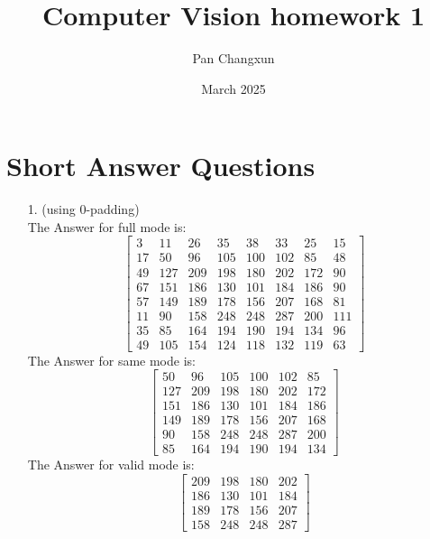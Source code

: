 \documentclass[]{article}
\title{Computer Vision homework 1}
\author{Pan Changxun}
\date{March 2025}
\begin{document}
\maketitle

\section{Short Answer Questions}
\begin{enumerate}
	\item[1.]
	(using 0-padding)\\
		The Answer for full mode is:
		\begin{equation*}
			\begin{bmatrix}
				3 & 11 & 26 & 35 & 38 & 33 & 25 & 15 \\
				17 & 50 & 96 & 105 & 100 & 102 & 85 & 48 \\
				49 & 127 & 209 & 198 & 180 & 202 & 172 & 90 \\
				67 & 151 & 186 & 130 & 101 & 184 & 186 & 90 \\
				57 & 149 & 189 & 178 & 156 & 207 & 168 & 81 \\
				11 & 90 & 158 & 248 & 248 & 287 & 200 & 111 \\
				35 & 85 & 164 & 194 & 190 & 194 & 134 & 96 \\
				49 & 105 & 154 & 124 & 118 & 132 & 119 & 63
			\end{bmatrix}
		\end{equation*}
		The Answer for same mode is:
		\begin{equation*}
			\begin{bmatrix}
				50 & 96 & 105 & 100 & 102 & 85 \\
				127 & 209 & 198 & 180 & 202 & 172 \\
				151 & 186 & 130 & 101 & 184 & 186 \\
				149 & 189 & 178 & 156 & 207 & 168 \\
				90 & 158 & 248 & 248 & 287 & 200 \\
				85 & 164 & 194 & 190 & 194 & 134
			\end{bmatrix}
		\end{equation*}
		The Answer for valid mode is:
		\begin{equation*}
			\begin{bmatrix}
				209 & 198 & 180 & 202 \\
				186 & 130 & 101 & 184 \\
				189 & 178 & 156 & 207 \\
				158 & 248 & 248 & 287

\end{bmatrix}
\end{equation*}
\end{enumerate}
\end{document}
